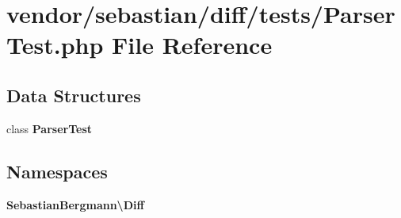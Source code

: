 \section{vendor/sebastian/diff/tests/\+Parser\+Test.php File Reference}
\label{sebastian_2diff_2tests_2_parser_test_8php}
\subsection*{Data Structures}
\begin{DoxyCompactItemize}
\item 
class {\bf Parser\+Test}
\end{DoxyCompactItemize}
\subsection*{Namespaces}
\begin{DoxyCompactItemize}
\item 
 {\bf Sebastian\+Bergmann\textbackslash{}\+Diff}
\end{DoxyCompactItemize}
